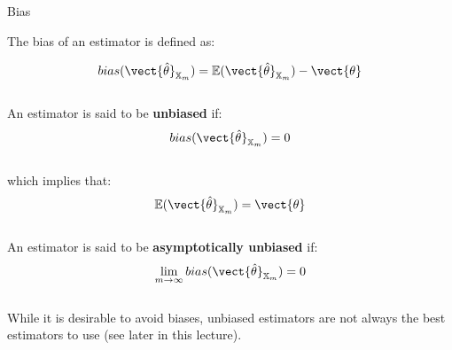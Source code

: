 
\begin{frame}[t]{Bias}

The \gls{bias} of an estimator is defined as:

\begin{equation}
    bias(\vect{\hat{\theta}}_{\mathbb{X}_{m}}) = 
      \mathbb{E}(\vect{\hat{\theta}}_{\mathbb{X}_{m}}) - \vect{\theta}
    \label{eq:bias}
\end{equation}\\

An estimator is said to be {\bf unbiased} if:
\begin{equation}
    bias(\vect{\hat{\theta}}_{\mathbb{X}_{m}}) = 0
    \label{eq:unbiased_estimator_1}
\end{equation}\\
which implies that:
\begin{equation}
    \mathbb{E}(\vect{\hat{\theta}}_{\mathbb{X}_{m}}) = \vect{\theta}
    \label{eq:unbiased_estimator_2}
\end{equation}\\

An estimator is said to be {\bf asymptotically unbiased} if:
\begin{equation}
    \lim_{m\rightarrow \infty} bias(\vect{\hat{\theta}}_{\mathbb{X}_{m}}) = 0
    \label{eq:asymptotically_unbiased_estimator_1}
\end{equation}\\

While it is desirable to avoid biases, 
unbiased estimators are not always the best estimators to use 
(see later in this lecture).

\end{frame}